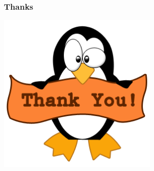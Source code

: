 \documentclass[10pt]{beamer}
\begin{document}
\begin{frame}
  \frametitle{Thanks}
\begin{center} 
  \includegraphics[width=0.6\textwidth]{thanks.png}
\end{center}
\end{frame}

\end{document}
